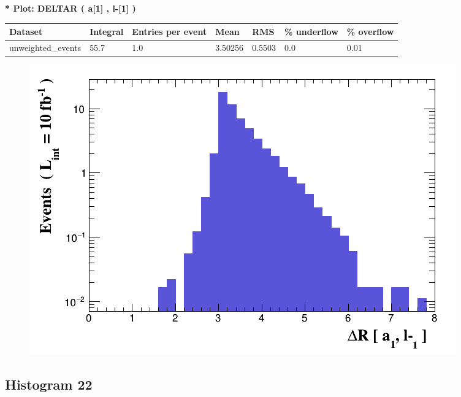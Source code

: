 \documentclass[a4paper, 10pt]{article}
\begin{document}
\textbf{* Plot: DELTAR ( a[1] , l-[1] ) }\\
   \begin{table}[H]
  \begin{center}
    \begin{tabular}{|m{23.0mm}|m{23.0mm}|m{18.0mm}|m{19.0mm}|m{19.0mm}|m{19.0mm}|m{19.0mm}|}
      \hline
      {\cellcolor{yellow}         Dataset}& {\cellcolor{yellow}         Integral}& {\cellcolor{yellow}         Entries per event}& {\cellcolor{yellow}         Mean}& {\cellcolor{yellow}         RMS}& {\cellcolor{yellow}         \% underflow}& {\cellcolor{yellow}         \% overflow}\\
      \hline
      {\cellcolor{white}         unweighted\_events}& {\cellcolor{white}         55.7}& {\cellcolor{white}         1.0}& {\cellcolor{white}         3.50256}& {\cellcolor{white}         0.5503}& {\cellcolor{green}         0.0}& {\cellcolor{green}         0.01}\\
\hline
    \end{tabular}
  \end{center}
\end{table}

\begin{figure}[H]
  \begin{center}
    \includegraphics[scale=0.45]{selection_20.png}\\
\caption{   }
  \end{center}
\end{figure}
      \newpage
\subsection{ Histogram 22}
\end{document}
